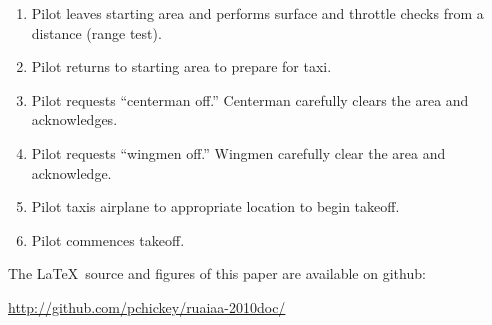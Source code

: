 \documentclass[pdftex,10pt,letter]{article}
\begin{document}
\begin{enumerate}
	\item Pilot leaves starting area and performs surface and throttle checks from a distance (range test).
	\item Pilot returns to starting area to prepare for taxi.
	\item Pilot requests ``centerman off.''  Centerman carefully clears the area and acknowledges.
	\item Pilot requests ``wingmen off.''  Wingmen carefully clear the area and acknowledge.
	\item Pilot taxis airplane to appropriate location to begin takeoff.
	\item Pilot commences takeoff.

\end{enumerate}

\newpage




The \LaTeX$\,$ source and figures of this paper are available on github:

\url{http://github.com/pchickey/ruaiaa-2010doc/}
\end{document}
